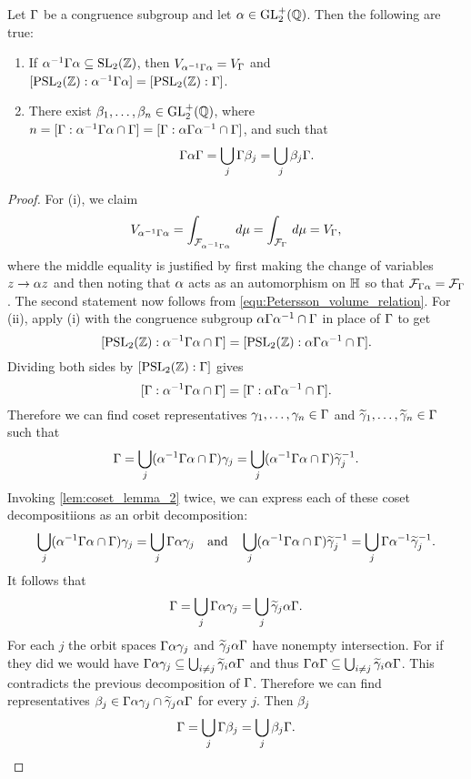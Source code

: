       \begin{lemma}\label{lem:Petersson_normality_lemma}
        Let $\Gamma$ be a congruence subgroup and let $\alpha \in \mathrm{GL}_{2}^{+}(\mathbb{Q})$. Then the following are true:
        \begin{enumerate}[label=(\roman*)]
          \item If $\alpha^{-1}\Gamma\alpha \subseteq \mathrm{SL}_{2}(\mathbb{Z})$, then $V_{\alpha^{-1}\Gamma\alpha} = V_{\Gamma}$ and $[\mathrm{PSL}_{2}(\mathbb{Z}):\alpha^{-1}\Gamma\alpha] = [\mathrm{PSL}_{2}(\mathbb{Z}):\Gamma]$.
          \item There exist $\beta_{1},\ldots,\beta_{n} \in \mathrm{GL}_{2}^{+}(\mathbb{Q})$, where $n = [\Gamma:\alpha^{-1}\Gamma\alpha \cap \Gamma] = [\Gamma:\alpha\Gamma\alpha^{-1} \cap \Gamma]$, and such that
          \[
            \Gamma\alpha\Gamma = \bigcup_{j}\Gamma\beta_{j} = \bigcup_{j}\beta_{j}\Gamma.
          \]
        \end{enumerate}
      \end{lemma}
      \begin{proof}
        For (i), we claim
        \[
          V_{\alpha^{-1}\Gamma\alpha} = \int_{\mathcal{F}_{\alpha^{-1}\Gamma\alpha}}\,d\mu = \int_{\mathcal{F}_{\Gamma}}\,d\mu = V_{\Gamma},
        \]
        where the middle equality is justified by first making the change of variables $z \to \alpha z$ and then noting that $\alpha$ acts as an automorphism on $\mathbb{H}$ so that $\mathcal{F}_{\Gamma\alpha} = \mathcal{F}_{\Gamma}$. The second statement now follows from \cref{equ:Petersson_volume_relation}. For (ii), apply (i) with the congruence subgroup $\alpha\Gamma\alpha^{-1} \cap \Gamma$ in place of $\Gamma$ to get
        \[
          [\mathrm{PSL}_{2}(\mathbb{Z}):\alpha^{-1}\Gamma\alpha \cap \Gamma] = [\mathrm{PSL}_{2}(\mathbb{Z}):\alpha\Gamma\alpha^{-1} \cap \Gamma].
        \]
        Dividing both sides by $[\mathrm{PSL}_{2}(\mathbb{Z}):\Gamma]$ gives
        \[
          [\Gamma:\alpha^{-1}\Gamma\alpha \cap \Gamma] = [\Gamma:\alpha\Gamma\alpha^{-1} \cap \Gamma].
        \]
        Therefore we can find coset representatives $\gamma_{1},\ldots,\gamma_{n} \in \Gamma$ and $\widetilde{\gamma}_{1},\ldots,\widetilde{\gamma}_{n} \in \Gamma$ such that
        \[
          \Gamma = \bigcup_{j}(\alpha^{-1}\Gamma\alpha \cap \Gamma)\gamma_{j} = \bigcup_{j}(\alpha^{-1}\Gamma\alpha \cap \Gamma)\widetilde{\gamma}_{j}^{-1}.
        \]
        Invoking \cref{lem:coset_lemma_2} twice, we can express each of these coset decompositiions as an orbit decomposition:
        \[
           \bigcup_{j}(\alpha^{-1}\Gamma\alpha \cap \Gamma)\gamma_{j} = \bigcup_{j}\Gamma\alpha\gamma_{j} \quad \text{and} \quad \bigcup_{j}(\alpha^{-1}\Gamma\alpha \cap \Gamma)\widetilde{\gamma}_{j}^{-1} = \bigcup_{j}\Gamma\alpha^{-1}\widetilde{\gamma}_{j}^{-1}.
        \]
        It follows that
        \[
          \Gamma = \bigcup_{j}\Gamma\alpha\gamma_{j} = \bigcup_{j}\widetilde{\gamma}_{j}\alpha\Gamma.
        \]
        For each $j$ the orbit spaces $\Gamma\alpha\gamma_{j}$ and $\widetilde{\gamma}_{j}\alpha\Gamma$ have nonempty intersection. For if they did we would have $\Gamma\alpha\gamma_{j} \subseteq \bigcup_{i \neq j}\widetilde{\gamma}_{i}\alpha\Gamma$ and thus $\Gamma\alpha\Gamma \subseteq \bigcup_{i \neq j}\widetilde{\gamma}_{i}\alpha\Gamma$. This contradicts the previous decomposition of $\Gamma$. Therefore we can find representatives $\beta_{j} \in \Gamma\alpha\gamma_{j} \cap \widetilde{\gamma}_{j}\alpha\Gamma$ for every $j$. Then $\beta_{j}$
        \[
          \Gamma = \bigcup_{j}\Gamma\beta_{j} = \bigcup_{j}\beta_{j}\Gamma.
        \] 
      \end{proof}

